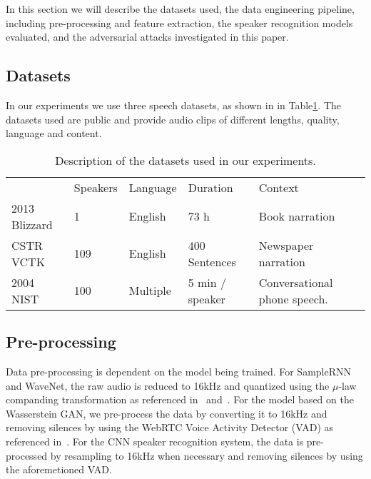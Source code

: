 In this section we will describe the datasets used, the data engineering
pipeline, including pre-processing and feature extraction, the speaker
recognition models evaluated, and the adversarial attacks investigated in this paper.

\subsection{Datasets}
In our experiments we use three speech datasets, as shown in  
in Table\ref{tbl:datasets}. The datasets used are public and provide audio clips
of different lengths, quality, language and content.

\begin{table}[!h]
\centering
\begin{tabular}{lllll}
                                                                     & \cellcolor[HTML]{C0C0C0}Speakers & \cellcolor[HTML]{C0C0C0}Language & \cellcolor[HTML]{C0C0C0}Duration & \cellcolor[HTML]{C0C0C0}Context \\ \cline{2-5} 
\multicolumn{1}{l|}{\cellcolor[HTML]{C0C0C0}2013 Blizzard} & 1                                & English                          & 73 h                             & Book narration                  \\
\multicolumn{1}{l|}{\cellcolor[HTML]{C0C0C0}CSTR VCTK}               & 109                              & English                          & 400 Sentences                    & Newspaper narration               \\
\multicolumn{1}{l|}{\cellcolor[HTML]{C0C0C0}2004 NIST}               & 100                              & Multiple                         & 5 min / speaker                  & Conversational phone speech.                          
\end{tabular}
\bigskip
\caption{Description of the datasets used in our experiments. }
\label{tbl:datasets}
\end{table}

\subsection{Pre-processing}
\label{sub:processdata}
Data pre-processing is dependent on the model being trained. For SampleRNN and
WaveNet, the raw audio is reduced to 16kHz and quantized using the $\mu$-law
companding transformation as referenced in~\cite{mehri2016samplernn}
and~\cite{van2016wavenet}. For the model based on the Wasserstein GAN,
we pre-process the data by converting it to 16kHz and removing silences by using
the WebRTC Voice Activity Detector (VAD) as referenced
in~\cite{zeidan2014webrtc}. For the CNN speaker recognition system, the data is
pre-processed by resampling to 16kHz when necessary and removing silences by
using the aforemetioned VAD. 

